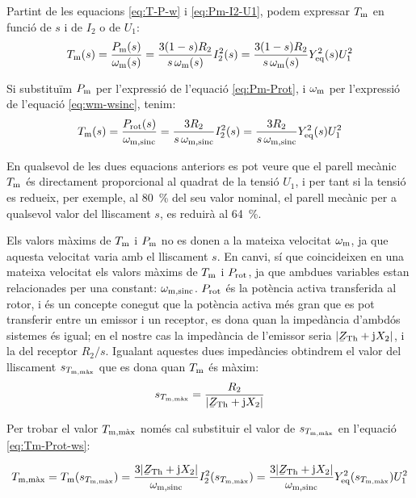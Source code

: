Partint de les equacions \eqref{eq:T-P-w} i \eqref{eq:Pm-I2-U1}, podem expressar  $T_\mathrm{m}$ en funció de $s$ i de $I_2$ o de $U_1$:
\begin{equation}
    T_\mathrm{m}(s)  =  \frac{P_\mathrm{m}(s)}{\omega_\mathrm{m}(s)} =  \frac{3(1-s) R_2}{s\,\omega_\mathrm{m}(s)} I_2^2(s) =
     \frac{3(1-s) R_2}{s\,\omega_\mathrm{m}(s)} Y_\mathrm{eq}^2(s) U_1^2
\end{equation}

Si substituïm $P_\mathrm{m}$ per l'expressió de l'equació \eqref{eq:Pm-Prot}, i $\omega_\mathrm{m}$ per l'expressió de l'equació \eqref{eq:wm-wsinc}, tenim:
\begin{equation}\index{motors d'inducció!parell mecànic}
    T\ped{m}(s)  =  \frac{P\ped{rot}(s)}{\omega\ped{m,sinc}} =   \frac{3 R_2}{s\,\omega\ped{m,sinc}} I_2^2(s) =
     \frac{3 R_2}{s\,\omega\ped{m,sinc}} Y\ped{eq}^2(s) U_1^2 \label{eq:Tm-Prot-ws}
\end{equation}

En qualsevol de les dues equacions anteriors es pot veure que el parell mecànic $T_\mathrm{m}$ és directament proporcional al quadrat de la tensió $U_1$, i per tant si la tensió es redueix, per exemple, al \qty{80}{\%} del seu valor nominal, el parell mecànic per a qualsevol valor del lliscament $s$,  es reduirà al \qty{64}{\%}.

Els valors màxims de $T_\mathrm{m}$ i $P_\mathrm{m}$ no es donen a la mateixa velocitat  $\omega_\mathrm{m}$, ja que aquesta velocitat varia amb el lliscament $s$. En canvi, sí que coincideixen en una mateixa velocitat els valors  màxims de $T_\mathrm{m}$ i $P_\mathrm{rot}$, ja que ambdues variables estan relacionades per una constant: $\omega_\mathrm{m,sinc}$. $P_\mathrm{rot}$ és la potència activa transferida al rotor, i és un concepte conegut que la potència activa més gran que es pot transferir entre un emissor i un receptor, es dona quan la impedància d'ambdós sistemes és igual; en el nostre cas la impedància de l'emissor seria $|\cmplx{Z}\ped{Th} + \ju X_2|$, i la del receptor $R_2/s$. Igualant aquestes dues impedàncies obtindrem el valor del lliscament $s_{T_\mathrm{m,\text{màx}}}$ que es dona quan $T_\mathrm{m}$ és màxim:
\begin{equation}
    s_{T\ped{m,\text{màx}}} =  \frac{R_2}{|\cmplx{Z}\ped{Th} + \ju X_2|} \label{eq:s-T-max}
\end{equation}

Per trobar el valor  $T_\mathrm{m,\text{màx}}$ només cal substituir el valor de $s_{T_\mathrm{m,\text{màx}}}$ en l'equació \eqref{eq:Tm-Prot-ws}:

\begin{equation}
    T\ped{m,\text{màx}}  =  T\ped{m}(s_{T\ped{m,\text{màx}}}) =  \frac{3 |\cmplx{Z}\ped{Th} + \ju X_2|}{\omega\ped{m,sinc}} I_2^2(s_{T\ped{m,\text{màx}}}) = \frac{3 |\cmplx{Z}\ped{Th} + \ju X_2|}{\omega\ped{m,sinc}} Y\ped{eq}^2(s_{T\ped{m,\text{màx}}}) U_1^2
\end{equation}


